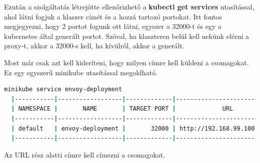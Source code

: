 \documentclass[a4paper,oneside]{article}
\begin{document}
Ezután a szolgáltatás létrejötte ellenőrizhető a \textbf{kubectl get services}
utasítással, ahol látni fogjuk a klaszer címét és a hozzá tartozó portokat.
Itt fontos megjegyezni, hogy 2 portot fogunk ott látni, egyszer a 32000-t és
egy a kubernetes által generált portot. Szóval, ha klaszteren belül
kell nekünk elérni a proxy-t, akkor a 32000-s kell, ha kívülről, akkor a
generált.

Most már csak azt kell kideríteni, hogy milyen címre kell küldeni a csomagokat.
Ez egy egyszerű minikube utasítással megoldható.
\begin{lstlisting}[language=bash]
  minikube service envoy-deployment
  |-----------|------------------|-------------|-----------------------------|
  | NAMESPACE |       NAME       | TARGET PORT |             URL             |
  |-----------|------------------|-------------|-----------------------------|
  | default   | envoy-deployment |       32000 | http://192.168.99.100:32315 |
  |-----------|------------------|-------------|-----------------------------|
\end{lstlisting}
Az URL rész alatti címre kell címezni a csomagokat.
%
%
\end{document}
